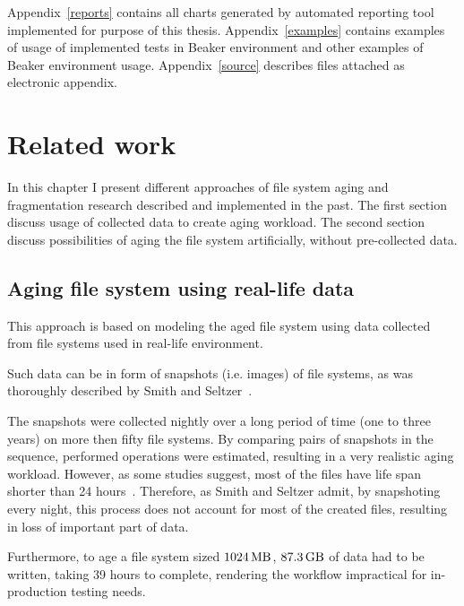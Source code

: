 \documentclass[
  color, %
  table, %
  lof,   %
  lot,   %
]{fithesis3}
\begin{document}
Appendix~\ref{reports} contains all charts generated by automated reporting tool implemented for purpose of this thesis. Appendix~\ref{examples} contains examples of usage of implemented tests in Beaker environment and other examples of Beaker environment usage. Appendix~\ref{source} describes files attached as electronic appendix.

\chapter{Related work}
\label{related}
In this chapter I present different approaches of file system aging and fragmentation research described and implemented in the past. The first section discuss usage of collected data to create aging workload. The second section discuss possibilities of aging the file system artificially, without pre-collected data.

\section{Aging file system using real-life data}
This approach is based on modeling the aged file system using data collected from file systems used in real-life environment.

Such data can be in form of snapshots (i.e. images) of file systems, as was thoroughly described by Smith and Seltzer~\cite{Smith:1997:FSA:258623.258689}.

The snapshots were collected nightly over a long period of time (one to three years) on more then fifty file systems. By comparing pairs of snapshots in the sequence, performed operations were estimated, resulting in a very realistic aging workload. However, as some studies suggest, most of the files have life span shorter than 24 hours~\cite{Ousterhout:1985:TAU:323647.323631}. Therefore, as Smith and Seltzer admit, by snapshoting every night, this process does not account for most of the created files, resulting in loss of important part of data.

Furthermore, to age a file system sized $\SI{1024}{\mega\byte}$, $\SI{87.3}{\giga\byte}$ of data had to be written, taking 39 hours to complete, rendering the workflow impractical for in-production testing needs.

\end{document}
